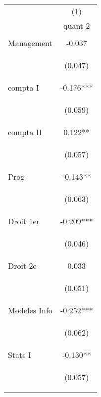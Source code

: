 \begin{center}
\begin{tabular}{lc} \hline
 & (1) \\
 & quant 2 \\ \hline
\vspace{4pt} & \begin{footnotesize}\end{footnotesize} \\
Management & -0.037 \\
\vspace{4pt} & \begin{footnotesize}(0.047)\end{footnotesize} \\
compta I & -0.176*** \\
\vspace{4pt} & \begin{footnotesize}(0.059)\end{footnotesize} \\
compta II & 0.122** \\
\vspace{4pt} & \begin{footnotesize}(0.057)\end{footnotesize} \\
Prog & -0.143** \\
\vspace{4pt} & \begin{footnotesize}(0.063)\end{footnotesize} \\
Droit 1er & -0.209*** \\
\vspace{4pt} & \begin{footnotesize}(0.046)\end{footnotesize} \\
Droit 2e & 0.033 \\
\vspace{4pt} & \begin{footnotesize}(0.051)\end{footnotesize} \\
Modeles Info & -0.252*** \\
\vspace{4pt} & \begin{footnotesize}(0.062)\end{footnotesize} \\
Stats I & -0.130** \\
\vspace{4pt} & \begin{footnotesize}(0.057)\end{footnotesize} \\

\end{tabular}
\end{center}
